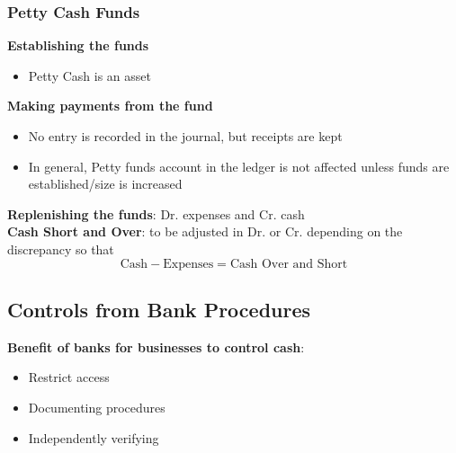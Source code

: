\documentclass{article}
\begin{document}
\begin{multicols}{2}
\subsubsection{Petty Cash Funds}
\textbf{Establishing the funds}
\begin{itemize}
	\item Petty Cash is an asset
\end{itemize}
\textbf{Making payments from the fund}
\begin{itemize}
	\item No entry is recorded in the journal, but receipts are kept
	\item In general, Petty funds account in the ledger is not affected unless funds are established/size is increased
\end{itemize}
\textbf{Replenishing the funds}: Dr. expenses and Cr. cash\\
\textbf{Cash Short and Over}: to be adjusted in Dr. or Cr. depending on the discrepancy so that
$$\text{Cash} - \text{Expenses} = \text{Cash Over and Short}$$
\subsection{Controls from Bank Procedures}
\textbf{Benefit of banks for businesses to control cash}:
\begin{itemize}
	\item Restrict access
	\item Documenting procedures
	\item Independently verifying
\end{itemize}

\end{multicols}
\end{document}
